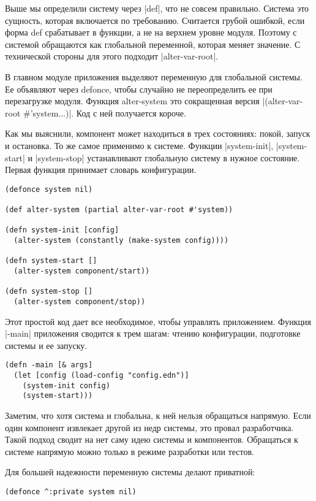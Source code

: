 Выше мы определили систему через \spverb|def|, что не совсем правильно. Система это
сущность, которая включается по требованию. Считается грубой ошибкой, если форма
def срабатывает в функции, а не на верхнем уровне модуля. Поэтому с системой
обращаются как глобальной переменной, которая меняет значение. С технической
стороны для этого подходит \spverb|alter-var-root|.

В главном модуле приложения выделяют переменную для глобальной системы. Ее
объявляют через defonce, чтобы случайно не переопределить ее при перезагрузке
модуля. Функция alter-system это сокращенная версия \spverb|(alter-var-root #'system...)|.
Код с ней получается короче.

Как мы выяснили, компонент может находиться в трех состояниях: покой, запуск и
остановка. То же самое применимо к системе. Функции \spverb|system-init|,
\spverb|system-start| и \spverb|system-stop| устанавливают глобальную систему в нужное
состояние. Первая функция принимает словарь конфигурации.

\begin{verbatim}
(defonce system nil)

(def alter-system (partial alter-var-root #'system))

(defn system-init [config]
  (alter-system (constantly (make-system config))))

(defn system-start []
  (alter-system component/start))

(defn system-stop []
  (alter-system component/stop))
\end{verbatim}

Этот простой код дает все необходимое, чтобы управлять приложением. Функция
\spverb|-main| приложения сводится к трем шагам: чтению конфигурации, подготовке
системы и ее запуску.

\begin{verbatim}
(defn -main [& args]
  (let [config (load-config "config.edn")]
    (system-init config)
    (system-start)))
\end{verbatim}

Заметим, что хотя система и глобальна, к ней нельзя обращаться напрямую. Если
один компонент извлекает другой из недр системы, это провал разработчика. Такой
подход сводит на нет саму идею системы и компонентов. Обращаться к системе
напрямую можно только в режиме разработки или тестов.

Для большей надежности переменную системы делают приватной:

\begin{verbatim}
(defonce ^:private system nil)
\end{verbatim}

